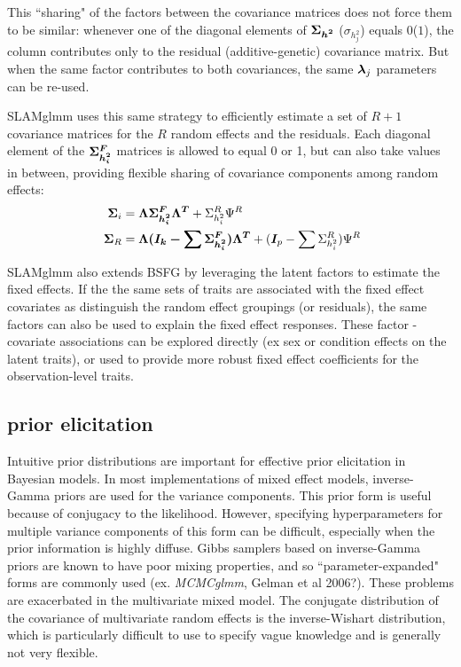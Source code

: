 \documentclass[11pt]{amsart}
\newcommand*{\B}[1]{\ifmmode\bm{#1}\else\textbf{#1}\fi}
\begin{document}
This ``sharing" of the factors between the covariance matrices does not force them to be similar: whenever one of the diagonal elements of $\B{\Sigma_{h^2}}$ ($\sigma_{h^2_j}$) equals $0$($1$), the column contributes only to the residual (additive-genetic) covariance matrix. But when the same factor contributes to both covariances, the same $\B{\lambda}_j$ parameters can be re-used.

SLAMglmm uses this same strategy to efficiently estimate a set of $R+1$ covariance matrices for the $R$ random effects and the residuals. Each diagonal element of the $\B{\Sigma^F_{h^2_i}}$ matrices is allowed to equal 0 or 1, but can also take values in between, providing flexible sharing of covariance components among random effects:
\begin{align}\begin{split}
\;\B{\Sigma}_i &= \B{\Lambda \Sigma^F_{h^2_i} \Lambda^T} + \Sigma^R_{h^2_i}\Psi^R \\
\;\B{\Sigma}_R &= \B{\Lambda (\B{I}_k - \sum \Sigma^F_{h^2_i}) \Lambda^T} + (\B{I}_p - \sum \Sigma^R_{h^2_i})\Psi^R 
\end{split} \end{align}

SLAMglmm also extends BSFG by leveraging the latent factors to estimate the fixed effects. If the the same sets of traits are associated with the fixed effect covariates as distinguish the random effect groupings (or residuals), the same factors can also be used to explain the fixed effect responses. These factor - covariate associations can be explored directly (ex sex or condition effects on the latent traits), or used to provide more robust fixed effect coefficients for the observation-level traits.

\subsection{prior elicitation}
\label{random_effect_priors}
Intuitive prior distributions are important for effective prior elicitation in Bayesian models. In most implementations of mixed effect models, inverse-Gamma priors are used for the variance components. This prior form is useful because of conjugacy to the likelihood. However, specifying hyperparameters for multiple variance components of this form can be difficult, especially when the prior information is highly diffuse. Gibbs samplers based on inverse-Gamma priors are known to have poor mixing properties, and so ``parameter-expanded" forms are commonly used (ex. \emph{MCMCglmm}, Gelman et al 2006?). These problems are exacerbated in the multivariate mixed model. The conjugate distribution of the covariance of multivariate random effects is the inverse-Wishart distribution, which is particularly difficult to use to specify vague knowledge and is generally not very flexible.
\end{document}

